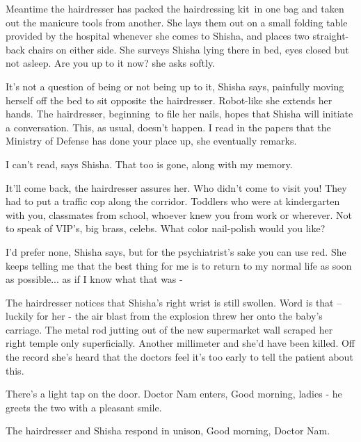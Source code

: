 \documentclass[letterpaper]{article}
\begin{document}
Meantime the hairdresser has packed the hairdressing kit~in one bag and taken out the manicure tools from another. She
lays them out on a small folding table provided by the hospital whenever she comes to Shisha, and places two
straight-back chairs on either side. She surveys Shisha lying there in bed, eyes closed but not asleep.
{\textquotedbl}Are you up to it now?{\textquotedbl} she asks softly.

{\textquotedbl}It's not a question of being or not being up to it,{\textquotedbl} Shisha says, painfully\textcolor{red}{
}moving herself off the bed to sit opposite the hairdresser. Robot-like she extends her hands. The hairdresser,
beginning~to file her nails, hopes that Shisha will initiate a conversation. This, as usual, doesn't happen.
{\textquotedbl}I read in the papers that the Ministry of Defense has done your place up,{\textquotedbl} she eventually
remarks. 

{\textquotedbl}I can't read,{\textquotedbl} says Shisha. {\textquotedbl}That too is gone, along with my
memory.{\textquotedbl} 

{\textquotedbl}It'll come back,{\textquotedbl} the hairdresser assures her. {\textquotedbl}Who didn't come to visit you!
They had to put a traffic cop along the corridor. Toddlers who were at kindergarten with you, classmates from school,
whoever knew you from work or wherever. Not to speak of VIP's, big brass, celebs. What color nail-polish would you
like? {\textquotedbl} 

{\textquotedbl}I'd\textcolor[rgb]{0.0,0.4392157,0.7529412}{ }prefer none,{\textquotedbl} Shisha says, {\textquotedbl}but
for the psychiatrist's sake you can use red. She keeps telling me that the best thing for me is to return to my normal
life as soon as possible... as if I know what that was -{\textquotedbl} ~

The hairdresser notices that Shisha's right wrist is still swollen. Word is that -- luckily for her - the air blast from
the explosion threw her onto the baby's carriage. The metal rod jutting out of the new supermarket wall scraped her
right temple only superficially. Another millimeter and she'd have been killed. Off the record she's heard that the
doctors feel it's too early to tell the patient about this.

There's a light tap on the door. Doctor Nam enters, {\textquotedbl}Good morning, ladies -{\textquotedbl} he greets the
two with a pleasant smile.

The hairdresser and Shisha respond in unison, {\textquotedbl}Good morning, Doctor Nam.{\textquotedbl} 
\end{document}
